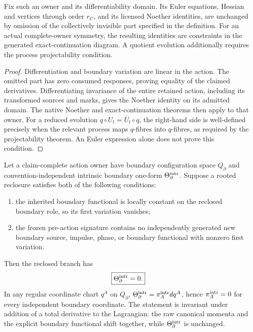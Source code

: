 \documentclass[12pt,a4paper]{article}
\begin{document}
\begin{theorem}
\label{p3a:thm:claim-complete-action-descent}
Fix such an owner and its differentiability domain.  Its Euler
equations, Hessian and vertices through order \(r_C\), and its
licensed Noether identities, are unchanged by omission of the
collectively invisible part specified in the definition.
For an actual complete-owner symmetry, the resulting identities
are constraints in the generated exact-continuation diagram.
A quotient evolution additionally requires the process
projectability condition.
\end{theorem}
\begin{proof}
Differentiation and boundary variation are linear in the action.
The omitted part has zero consumed responses, proving equality of
the claimed derivatives.  Differentiating invariance of the entire
retained action, including its transformed sources and marks,
gives the Noether identity on its admitted domain.  The native
Noether and exact-continuation theorems then apply to that owner.
For a reduced evolution \(q\circ U_t=\bar U_t\circ q\), the
right-hand side is well-defined precisely when the relevant process
maps \(q\)-fibres into \(q\)-fibres, as required by the projectability
theorem.  An Euler expression alone does not prove this condition.
\end{proof}

\begin{corollary}
\label{p3a:cor:boundary-trivial-same-action-reclosure}
Let a claim-complete action owner have boundary configuration space
\(Q_{\partial}\) and convention-independent intrinsic boundary one-form
\(\Theta_{\partial}^{\rm intr}\).  Suppose a rooted reclosure satisfies both
of the following conditions:
\begin{enumerate}
\item the inherited boundary functional is locally constant on the reclosed
boundary role, so its first variation vanishes;
\item the frozen pre-action signature contains no independently generated new
boundary source, impulse, phase, or boundary functional with nonzero first
variation.
\end{enumerate}
Then the reclosed branch has
\begin{equation}
\label{p3a:eq:boundary-trivial-zero-cotangent}
 \boxed{\Theta_{\partial}^{\rm intr}=0.}
\end{equation}
In any regular coordinate chart \(q^A\) on \(Q_{\partial}\),
\(\Theta_{\partial}^{\rm intr}=\pi_A^{\rm intr}dq^A\), hence
\(\pi_A^{\rm intr}=0\) for every independent boundary coordinate.  The
statement is invariant under addition of a total derivative to the
Lagrangian: the raw canonical momenta and the explicit boundary functional
shift together, while \(\Theta_{\partial}^{\rm intr}\) is unchanged.
\end{corollary}
\end{document}
